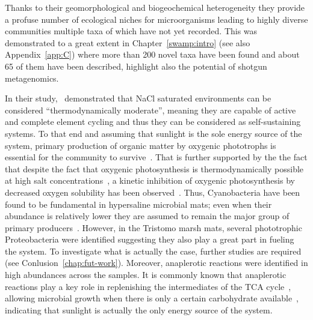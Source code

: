    Thanks to their geomorphological and biogeochemical heterogeneity
   they provide a profuse number of ecological niches for microorganisms
   leading to highly diverse communities multiple taxa of which have not yet recorded.
   This was demonstrated to a great extent in Chapter~\ref{swamp:intro} (see also Appendix~\ref{app:C})
   where more than 200 novel taxa have been found and about 65 of them have 
   been described, highlight also the potential of shotgun metagenomics. 

   In their study,~\citeauthor{lee_nacl-saturated_2018} demonstrated 
   that NaCl saturated environments can be considered 
   “thermodynamically moderate”, meaning they are capable of 
   active and complete element cycling  
   and thus they can be considered as self-sustaining systems.
   To that end and assuming 
   that sunlight is the sole energy source of the system, 
   primary production of organic matter 
   by oxygenic phototrophs is essential for the community to survive~\citep{meier_limitation_2021}. 
   That is further supported by the the fact that 
   despite the fact that oxygenic photosynthesis is thermodynamically possible 
   at high salt concentrations~\citep{oren_thermodynamic_2011}, 
   a kinetic inhibition of oxygenic photosynthesis 
   by decreased oxygen solubility has been observed~\citep{abed2007effect}.
   Thus, Cyanobacteria have been found to be fundamental in hypersaline 
   microbial mats; 
   even when their abundance is relatively lower  
   they are assumed to remain the major group of 
   primary producers~\citep{bolhuis_molecular_2014}.
   However, in the Tristomo marsh mats, several phototrophic 
   Proteobacteria were identified suggesting they also play a great part 
   in fueling the system. 
   To investigate what is actually the case, further studies are required (see Conlusion~\ref{chap:fut-work}).
   Moreover, anaplerotic reactions were identified in high abundances across the samples.
   It is commonly known that anaplerotic reactions play a key role 
   in replenishing the intermediates of the TCA cycle~\citep{owen2002key},
   allowing microbial growth 
   when there is only a certain
   carbohydrate available~\citep{choi_distinct_2016}, indicating that sunlight 
   is actually the only energy source of the system. 

